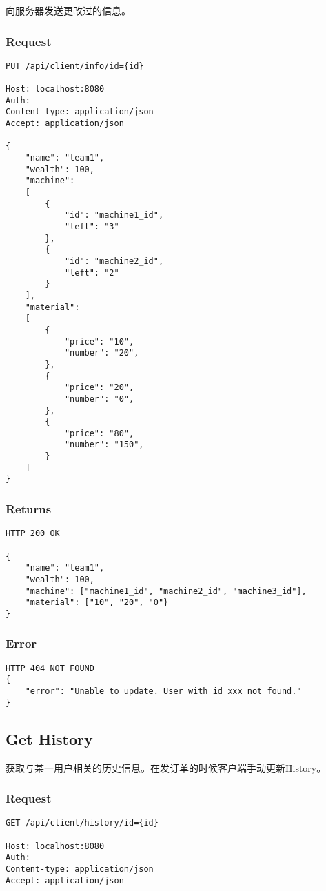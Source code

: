 \documentclass{article}
\begin{document}
向服务器发送更改过的信息。

\subsubsection*{Request}
\begin{lstlisting}
PUT /api/client/info/id={id}

Host: localhost:8080
Auth:
Content-type: application/json
Accept: application/json

{
    "name": "team1",
    "wealth": 100,
    "machine":
    [
        {
            "id": "machine1_id",
            "left": "3"
        },
        {
            "id": "machine2_id",
            "left": "2"
        }
    ],
    "material":
    [
        {
            "price": "10",
            "number": "20",
        },
        {
            "price": "20",
            "number": "0",
        },
        {
            "price": "80",
            "number": "150",
        }
    ]
}
\end{lstlisting}

\subsubsection*{Returns}
\begin{lstlisting}
HTTP 200 OK

{
    "name": "team1",
    "wealth": 100,
    "machine": ["machine1_id", "machine2_id", "machine3_id"],
    "material": ["10", "20", "0"}
}
\end{lstlisting}

\subsubsection*{Error}
\begin{lstlisting}
HTTP 404 NOT FOUND
{
    "error": "Unable to update. User with id xxx not found."
}
\end{lstlisting}

\subsection{Get History}

获取与某一用户相关的历史信息。在发订单的时候客户端手动更新History。

\subsubsection*{Request}
\begin{lstlisting}
GET /api/client/history/id={id}

Host: localhost:8080
Auth:
Content-type: application/json
Accept: application/json
\end{lstlisting}
\end{document}
